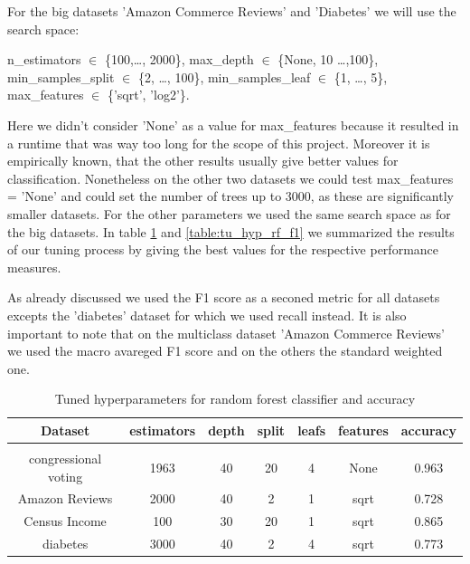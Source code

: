\documentclass[a4paper,10pt]{article}
\begin{document}
For the big datasets 'Amazon Commerce Reviews' and 'Diabetes' we will use the search space:
 

\begin{center}
    \parbox{0.75\textwidth}{%
    \raggedright
    \textsf{n\_estimators} \(\in\) \{100,\dots, 2000\}, \textsf{max\_depth} \(\in\) \{None, 10 \dots ,100\}, \\
    \textsf{min\_samples\_split} \(\in\) \{2, \dots, 100\}, \textsf{min\_samples\_leaf} \(\in\) \{1, \dots, 5\}, \\
    \textsf{max\_features} \(\in\) \{'sqrt', 'log2'\}.}
\end{center}

Here we didn't consider 'None' as a value for \textsf{max\_features} because it resulted in a runtime that was way too long for the scope of this project. Moreover it is empirically known, that the other results usually give better values for classification. Nonetheless on the other two datasets we could test \textsf{max\_features} = 'None' and could set the number of trees up to 3000, as these are significantly smaller datasets. For the other parameters we used the same search space as for the big datasets. In table \ref{table:tu_hyp_rf_ac} and \ref{table:tu_hyp_rf_f1} we summarized the results of our tuning process by giving the best values for the respective performance measures.

As already discussed we used the F1 score as a seconed metric for all datasets excepts the 'diabetes' dataset for which we used recall instead. It is also important to note that on the multiclass dataset 'Amazon Commerce Reviews' we used the macro avareged F1 score and on the others the standard weighted one.

\begin{table}[h!]
    \centering
    \begin{tabular}{|c|c|c|c|c|c|c|}
    \hline
    Dataset & \textsf{estimators} & \textsf{depth} & \textsf{split} & \textsf{leafs} & \textsf{features} & accuracy \\
    \hline
    \multicolumn{7}{c}{\vspace{-0.4cm}} \\ %
    \hline
    congressional voting & 1963 & 40 & 20 & 4 & None & 0.963 \\%
    \hline
    Amazon Reviews & 2000 & 40 & 2 & 1 & sqrt & 0.728 \\%
    \hline
    Census Income & 100 & 30 & 20 & 1 & sqrt & 0.865 \\%
    \hline
    diabetes & 3000 & 40 & 2 & 4 & sqrt & 0.773 \\%
    \hline
    \end{tabular}
    \caption{Tuned hyperparameters for random forest classifier and accuracy} 
    \label{table:tu_hyp_rf_ac}
    \end{table}
\end{document}
